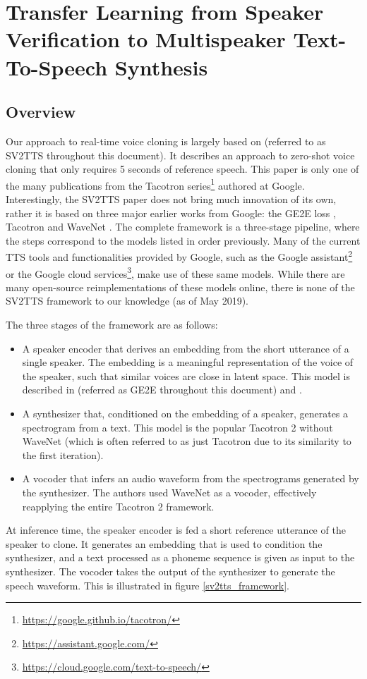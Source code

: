 \documentclass[a4paper, oneside, 12pt, english]{article}
\begin{document}
\section{Transfer Learning from Speaker Verification to Multispeaker Text-To-Speech Synthesis}
\subsection{Overview}
Our approach to real-time voice cloning is largely based on \citep{SV2TTS} (referred to as SV2TTS throughout this document). It describes an approach to zero-shot voice cloning that only requires 5 seconds of reference speech. This paper is only one of the many publications from the Tacotron series\footnote{\url{https://google.github.io/tacotron/}} authored at Google. Interestingly, the SV2TTS paper does not bring much innovation of its own, rather it is based on three major earlier works from Google: the GE2E loss \citep{GE2E}, Tacotron \citep{Tacotron1} and WaveNet \citep{WaveNet}. The complete framework is a three-stage pipeline, where the steps correspond to the models listed in order previously. Many of the current TTS tools and functionalities provided by Google, such as the Google assistant\footnote{\url{https://assistant.google.com/}} or the Google cloud services\footnote{\url{https://cloud.google.com/text-to-speech/}}, make use of these same models. While there are many open-source reimplementations of these models online, there is none of the SV2TTS framework to our knowledge (as of May 2019).

The three stages of the framework are as follows:
\begin{itemize}
	\item A speaker encoder that derives an embedding from the short utterance of a single speaker. The embedding is a meaningful representation of the voice of the speaker, such that similar voices are close in latent space. This model is described in \citep{GE2E} (referred as GE2E throughout this document) and \citep{TE2E}.
	\item A synthesizer that, conditioned on the embedding of a speaker, generates a spectrogram from a text. This model is the popular Tacotron 2 \citep{Tacotron2} without WaveNet (which is often referred to as just Tacotron due to its similarity to the first iteration).
	\item A vocoder that infers an audio waveform from the spectrograms generated by the synthesizer. The authors used WaveNet \citep{WaveNet} as a vocoder, effectively reapplying the entire Tacotron 2 framework.
\end{itemize}
At inference time, the speaker encoder is fed a short reference utterance of the speaker to clone. It generates an embedding that is used to condition the synthesizer, and a text processed as a phoneme sequence is given as input to the synthesizer. The vocoder takes the output of the synthesizer to generate the speech waveform. This is illustrated in figure \ref{sv2tts_framework}.
\end{document}
